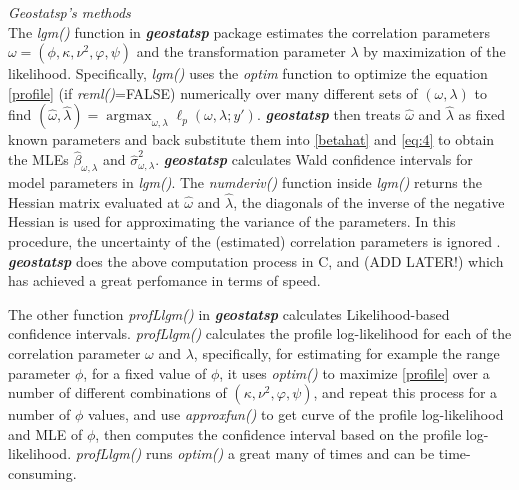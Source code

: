 \documentclass{article}\usepackage[]{graphicx}\usepackage[]{color}
\DeclareMathOperator*{\argmax}{argmax}
\newcommand{\prog}[1]{\textsf{#1}}
\newcommand{\pkg}[1]{\textbf{\emph{#1}}}
\newcommand{\fct}[1]{\textit{#1()}}
\def\MVN{{\mathrm{MVN}}}
\newtheorem{theorem}{Theorem}[section]
\begin{document}
\textit{Geostatsp's methods}\vspace{0.5cm}\\
The \fct{lgm} function in \pkg{geostatsp} package estimates the correlation parameters $\omega=(\phi,\kappa,\nu^2, \varphi, \psi)$ and the transformation parameter $\lambda$ by maximization of the likelihood. Specifically, \fct{lgm} uses the \textit{optim} function to optimize the equation \eqref{profile} (if \fct{reml}=FALSE)  numerically over many different sets of $(\omega, \lambda)$ to find $(\hat{\omega},\hat{\lambda}) = \argmax_{\omega,\lambda} \ell_p(\omega, \lambda; y')$.  \pkg{geostatsp} then treats $\hat{\omega}$ and $\hat{\lambda}$ as fixed known parameters and back substitute them into \eqref{betahat} and \eqref{eq:4} to obtain the MLEs $\hat{\beta}_{\omega,\lambda}$ and $\hat{\sigma}^2_{\omega,\lambda}$.  \pkg{geostatsp} calculates Wald confidence intervals for model parameters in \fct{lgm}. The \fct{numderiv} function inside \fct{lgm} returns the Hessian matrix evaluated at $\hat{\omega}$ and $\hat{\lambda}$, the diagonals of the inverse of the negative Hessian is used for approximating the variance of the parameters. In this procedure, the uncertainty of the (estimated) correlation parameters is ignored . \pkg{geostatsp} does the above computation process in \prog{C}, and (ADD LATER!) which has achieved a great perfomance in terms of speed.      

The other function \fct{profLlgm} in \pkg{geostatsp} calculates Likelihood-based confidence intervals. \fct{profLlgm} calculates the profile log-likelihood for each of the correlation parameter $\omega$ and $\lambda$, specifically, for estimating for example the range parameter $\phi$, for a fixed value of $\phi$, it uses \fct{optim} to maximize \eqref{profile} over a number of different combinations of $(\kappa,\nu^2, \varphi, \psi)$, and repeat this process for a number of $\phi$ values, and use \fct{approxfun} to get curve of the profile log-likelihood and MLE of $\phi$, then computes the confidence interval based on the profile log-likelihood.  \fct{profLlgm} runs \fct{optim} a great many of times and can be time-consuming.
\end{document}
